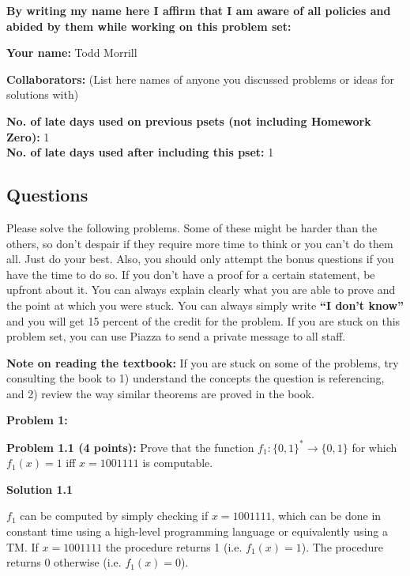 \documentclass[11pt]{article}
\begin{document}
	\textbf{By writing my name here I affirm that I am aware of all policies
		and abided by them while working on this problem set:}
	
	\textbf{Your name:} Todd Morrill
	
	\textbf{Collaborators:} (List here names of anyone you discussed
	problems or ideas for solutions with)
	
	\textbf{No. of late days used on previous psets (not including Homework Zero): } 1\\
	\textbf{No. of late days used after including this pset: } 1
	
	
	\newpage
	
	\subsection*{Questions}\label{questions}


Please solve the following problems. Some of these might be harder than
the others, so don't despair if they require more time to think or you
can't do them all. Just do your best. Also, you should only attempt the
bonus questions if you have the time to do so. If you don't have a proof
for a certain statement, be upfront about it. You can always explain
clearly what you are able to prove and the point at which you were
stuck. 
You can always simply write
\textbf{``I don't know''} and you will get 15 percent of the credit for
the problem. If you are stuck on this problem set, you can use Piazza to
send a private message to all staff.


\textbf{Note on reading the textbook:} If you are stuck on some of the
problems, try consulting the book to 1) understand the concepts the
question is referencing, and 2) review the way similar theorems are
proved in the book.

\newcommand{\HALT}{\mathrm{HALT}}
\newcommand{\SPACEHOG}{\textrm{SPACE-HOG}}

\newpage

\textbf{Problem 1:}

\textbf{Problem 1.1 (4 points):} Prove that the function $f_1:\{0,1\}^* \to \{0,1\}$ for which $f_1(x) = 1$ iff $x = 1001111$ is computable.

\textbf{Solution 1.1}

$f_1$ can be computed by simply checking if $x = 1001111$, which can be done in constant time using a high-level programming language or equivalently using a TM. If $x = 1001111$ the procedure returns 1 (i.e. $f_1(x) = 1$). The procedure returns 0 otherwise (i.e. $f_1(x) = 0$).
\end{document}
